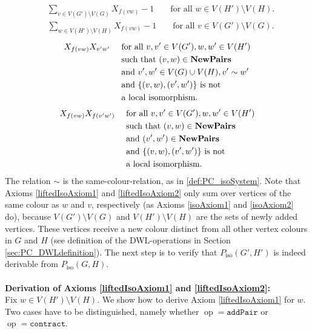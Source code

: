 \documentclass[a4paper,UKenglish,cleveref, autoref, thm-restate]{lipics-v2021}
\newcommand{\Pairs}{\text{\upshape \textbf{NewPairs}}}
\newcommand{\pairOp }{\texttt{addPair}}
\newcommand{\sccOp }{\texttt{contract}}
\newcommand{\op}{\operatorname{op}}
\newcommand{\Piso}{P_{\text{iso}}}
\begin{document}
	\begin{align}
		\label{liftedIsoAxiom1}
		&\sum_{v \in V(G') \setminus V(G)} X_{f(vw)} - 1 & &\text{ for all } w \in V(H') \setminus V(H).
	\end{align}
	\begin{align}
		\label{liftedIsoAxiom2}
		&\sum_{w \in V(H') \setminus V(H)} X_{f(vw)} - 1 & &\text{ for all } v \in V(G') \setminus V(G).
	\end{align}
	\begin{align}
		\label{liftedIsoAxiom3}
		&X_{f(vw)}X_{v'w'} & &\text{ for all } v,v' \in V(G'), w,w' \in V(H')\\
		& & &\text{ such that } (v,w) \in \Pairs  \notag\\
		& & &\text{ and } v', w' \in V(G) \cup V(H), v' \sim w' \notag\\ 
		& & &\text{ and } \{(v,w),(v',w')\} \text{ is not} \notag\\
		& & & \text{ a local isomorphism.} \notag
	\end{align}
	\begin{align}
		\label{liftedIsoAxiom4}
		&X_{f(vw)}X_{f(v'w')} & &\text{ for all } v,v' \in V(G'), w,w' \in V(H')\\
		& & &\text{ such that } (v,w) \in \Pairs \notag\\
		& & &\text{ and } (v',w') \in \Pairs \notag\\ 
		& & &\text{ and } \{(v,w),(v',w')\} \text{ is not} \notag\\
		& & & \text{ a local isomorphism.} \notag
	\end{align}
	The relation $\sim$ is the same-colour-relation, as in \autoref{def:PC_isoSystem}. Note that Axioms \eqref{liftedIsoAxiom1} and \eqref{liftedIsoAxiom2} only sum over vertices of the same colour as $w$ and $v$, respectively (as Axioms \eqref{isoAxiom1} and \eqref{isoAxiom2} do), because $V(G') \setminus V(G)$ and $V(H') \setminus V(H)$ are the sets of newly added vertices. These vertices receive a new colour distinct from all other vertex colours in $G$ and $H$ (see definition of the DWL-operations in Section \ref{sec:PC_DWLdefinition}). 
	The next step is to verify that $\Piso(G',H')$ is indeed derivable from $\Piso(G,H)$.\\
	\\
	\textbf{Derivation of Axioms \eqref{liftedIsoAxiom1} and \eqref{liftedIsoAxiom2}:}\\
	Fix $w \in V(H') \setminus V(H)$. We show how to derive Axiom \eqref{liftedIsoAxiom1} for $w$.
	Two cases have to be distinguished, namely whether $\op = \pairOp$ or $\op= \sccOp$.\\
\end{document}
